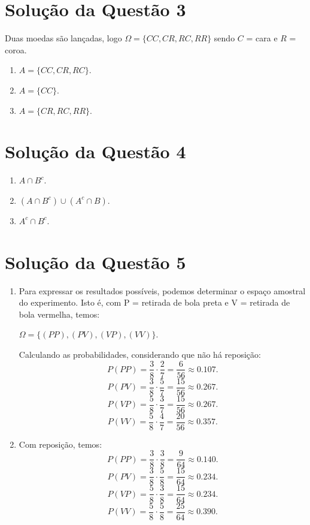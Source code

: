 \documentclass[
	12pt,				%
	openright,			%
	twoside,			%
	a4paper,			%
	english,			%
	french,				%
	spanish,			%
	brazil,				%
	]{abntex2}
\begin{document}
\section{Solução da Questão 3}
Duas moedas são lançadas, logo $\Omega = \{CC, CR, RC, RR\}$ sendo $C$ = cara e $R$ = coroa.

\begin{enumerate}[label=\alph*)]
    \item $A = \{CC, CR, RC\}$.
    \item $A = \{CC\}$.
    \item $A = \{CR, RC, RR\}$.
\end{enumerate}

\section{Solução da Questão 4}
\begin{enumerate}[label=\alph*)]
    \item $A\cap B^c$.
    \item $(A\cap B^c) \cup (A^c \cap B)$.
    \item $A^c \cap B^c$.
\end{enumerate}

\section{Solução da Questão 5}
\begin{enumerate}[label=\alph*)]
    \item Para expressar os resultados possíveis, podemos determinar o espaço amostral do experimento.
    Isto é, com P = retirada de bola preta e V = retirada de bola vermelha, temos:
    
    $\Omega = \{(PP), (PV), (VP), (VV)\}$.

    Calculando as probabilidades, considerando que não há reposição: 
    $$P(PP) = \frac{3}{8}\cdot\frac{2}{7} = \frac{6}{56} \approx 0.107.$$
    $$P(PV) = \frac{3}{8}\cdot\frac{5}{7} = \frac{15}{56} \approx 0.267.$$
    $$P(VP) = \frac{5}{8}\cdot\frac{3}{7} = \frac{15}{56} \approx 0.267.$$
    $$P(VV) = \frac{5}{8}\cdot\frac{4}{7} = \frac{20}{56} \approx 0.357.$$
    
    \item Com reposição, temos:
    $$P(PP) = \frac{3}{8}\cdot\frac{3}{8} = \frac{9}{64} \approx 0.140.$$
    $$P(PV) = \frac{3}{8}\cdot\frac{5}{8} = \frac{15}{64} \approx 0.234.$$
    $$P(VP) = \frac{5}{8}\cdot\frac{3}{8} = \frac{15}{64} \approx 0.234.$$
    $$P(VV) = \frac{5}{8}\cdot\frac{5}{8} = \frac{25}{64} \approx 0.390.$$
    
\end{enumerate}
\end{document}
